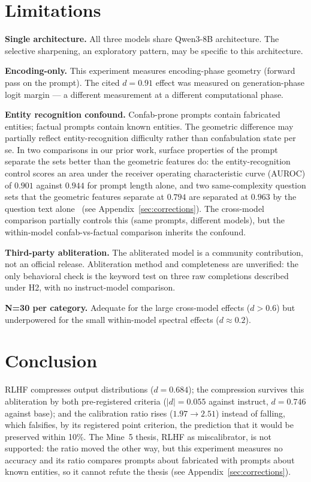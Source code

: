 \documentclass[11pt,a4paper]{article}
\begin{document}
\section{Limitations}
\label{sec:limitations}

\textbf{Single architecture.} All three models share Qwen3-8B
architecture. The selective sharpening, an exploratory pattern, may be
specific to this architecture.

\textbf{Encoding-only.} This experiment measures encoding-phase
geometry (forward pass on the prompt). The cited $d{=}0.91$ effect
was measured on generation-phase logit margin
--- a different measurement at a different computational phase.

\textbf{Entity recognition confound.} Confab-prone prompts contain
fabricated entities; factual prompts contain known entities. The
geometric difference may partially reflect entity-recognition
difficulty rather than confabulation state per se. In two comparisons
in our prior work, surface properties of the prompt separate the sets
better than the geometric features do: the entity-recognition control scores an
area under the receiver operating characteristic curve (AUROC) of
$0.901$ against $0.944$ for prompt length alone, and two same-complexity
question sets that the geometric features separate at $0.794$ are separated
at $0.963$ by the question text alone~\citep{lyra2026decision} (see
Appendix~\ref{sec:corrections}). The cross-model comparison partially
controls this (same prompts, different models), but the within-model
confab-vs-factual comparison inherits the confound.

\textbf{Third-party abliteration.} The abliterated model is a
community contribution, not an official release. Abliteration
method and completeness are unverified: the only behavioral check is
the keyword test on three raw completions described under H2, with no
instruct-model comparison.

\textbf{N=30 per category.} Adequate for the large cross-model
effects ($d{>}0.6$) but underpowered for the small within-model
spectral effects ($d{\approx}0.2$).

\section{Conclusion}

RLHF compresses output distributions ($d{=}0.684$); the compression
survives this abliteration by both pre-registered criteria
($|d| = 0.055$ against instruct, $d = 0.746$ against base); and the
calibration ratio rises ($1.97 \to 2.51$) instead of falling, which
falsifies, by its registered point criterion, the prediction that it
would be preserved within 10\%. The Mine~5 thesis, RLHF as
miscalibrator, is not supported: the ratio moved the other way, but
this experiment measures no accuracy and its ratio compares prompts
about fabricated with prompts about known entities, so it cannot
refute the thesis (see Appendix~\ref{sec:corrections}).
\end{document}
